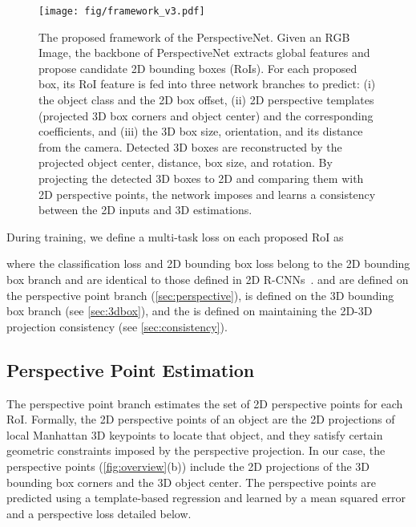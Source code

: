 \documentclass{article}
\begin{document}
\begin{figure}[t!]
    \begin{center}
        \texttt{[image: fig/framework\_v3.pdf]}
    \end{center}
    \vspace{-6pt}
    \caption{The proposed framework of the PerspectiveNet. Given an RGB Image, the backbone of PerspectiveNet extracts global features and propose candidate 2D bounding boxes (RoIs). For each proposed box, its RoI feature is fed into three network branches to predict: (i) the object class and the 2D box offset, (ii) 2D perspective templates (projected 3D box corners and object center) and the corresponding coefficients, and (iii) the 3D box size, orientation, and its distance from the camera. Detected 3D boxes are reconstructed by the projected object center, distance, box size, and rotation. By projecting the detected 3D boxes to 2D and comparing them with 2D perspective points, the network imposes and learns a consistency between the 2D inputs and 3D estimations.}
    \label{fig:framework}
    \vspace{6pt}
\end{figure}

During training, we define a multi-task loss on each proposed RoI as

where the classification loss  and 2D bounding box loss  belong to the 2D bounding box branch and are identical to those defined in 2D R-CNNs~\cite{ren2015faster,he2017mask}.  and  are defined on the perspective point branch (\autoref{sec:perspective}),  is defined on the 3D bounding box branch (see \autoref{sec:3dbox}), and the  is defined on maintaining the 2D-3D projection consistency (see \autoref{sec:consistency}).


\subsection{Perspective Point Estimation}
\label{sec:perspective}

The perspective point branch estimates the set of 2D perspective points for each RoI. Formally, the 2D perspective points of an object are the 2D projections of local Manhattan 3D keypoints to locate that object, and they satisfy certain geometric constraints imposed by the perspective projection. In our case, the perspective points (\autoref{fig:overview}(b)) include the 2D projections of the 3D bounding box corners and the 3D object center. The perspective points are predicted using a template-based regression and learned by a mean squared error and a perspective loss detailed below.
\end{document}
